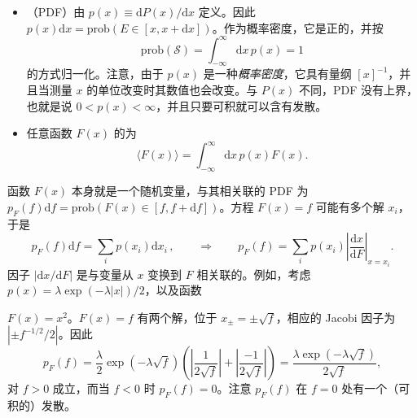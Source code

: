 \begin{itemize}[itemsep=0.45em,topsep=0.4em]
  \item {}（PDF）由 $p(x)\equiv\mathrm{d}P(x)/\mathrm{d}x$ 定义。因此 $p(x)\mathrm{d}x=\mathrm{prob}(E\in[x,x+\mathrm{d}x])$。作为概率密度，它是正的，并按
  \begin{equation}\label{eq:2.1}
    \mathrm{prob}(\mathscr{S})=\int_{-\infty}^{\infty}\mathrm{d}x\,p(x)=1
  \end{equation}
  的方式归一化。注意，由于 $p(x)$ 是一种\emph{概率密度}，它具有量纲 $[x]^{-1}$，并且当测量 $x$ 的单位改变时其数值也会改变。与 $P(x)$ 不同，PDF 没有上界，也就是说 $0<p(x)<\infty$，并且只要可积就可以含有发散。

  \item 任意函数 $F(x)$ 的为
  \begin{equation}\label{eq:2.2}
    \langle F(x)\rangle=\int_{-\infty}^{\infty}\mathrm{d}x\,p(x)F(x).
  \end{equation}
\end{itemize}


函数 $F(x)$ 本身就是一个随机变量，与其相关联的 PDF 为 $p_F(f)\mathrm{d}f=\mathrm{prob}(F(x)\in[f,f+\mathrm{d}f])$。方程 $F(x)=f$ 可能有多个解 $x_i$，于是
\begin{equation}\label{eq:2.3}
  p_F(f)\mathrm{d}f=\sum_i p(x_i)\mathrm{d}x_i\,,\qquad\Longrightarrow\qquad p_F(f)=\sum_i p(x_i)\left|\frac{\mathrm{d}x}{\mathrm{d}F}\right|_{x=x_i}.
\end{equation}
因子 $|\mathrm{d}x/\mathrm{d}F|$ 是与变量从 $x$ 变换到 $F$ 相关联的。例如，考虑 $p(x)=\lambda\exp(-\lambda|x|)/2$，以及函数

$F(x)=x^2$。$F(x)=f$ 有两个解，位于 $x_{\pm}=\pm\sqrt{f}$，相应的 Jacobi 因子为 $|\pm f^{-1/2}/2|$。因此
\begin{equation*}
  p_F(f)=\frac{\lambda}{2}\exp\!\left(-\lambda\sqrt{f}\right)\left(\left|\frac{1}{2\sqrt{f}}\right|+\left|\frac{-1}{2\sqrt{f}}\right|\right)=\frac{\lambda\exp\!\left(-\lambda\sqrt{f}\right)}{2\sqrt{f}},
\end{equation*}
对 $f>0$ 成立，而当 $f<0$ 时 $p_F(f)=0$。注意 $p_F(f)$ 在 $f=0$ 处有一个（可积的）发散。


